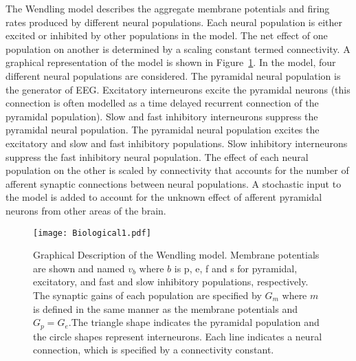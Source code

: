 The Wendling model describes the aggregate membrane potentials and firing rates produced by different neural populations. Each neural population is either excited or inhibited by other populations in the model. The net effect of one population on another is determined by a scaling constant termed connectivity. A graphical representation of the model is shown in Figure~\ref{fig: Biological}. In the model, four different neural populations are considered. The pyramidal neural population is the generator of EEG. Excitatory interneurons excite the pyramidal neurons (this connection is often modelled as a time delayed recurrent connection of the pyramidal population). Slow and fast inhibitory interneurons suppress the pyramidal neural population. The pyramidal neural population excites the excitatory and slow and fast inhibitory populations. Slow inhibitory interneurons suppress the fast inhibitory neural population. The effect of each neural population on the other is scaled by connectivity that accounts for the number of afferent synaptic connections between neural populations. A stochastic input to the model is added to account for the unknown effect of afferent pyramidal neurons from other areas of the brain.%
\begin{figure}  %
	\centering
		\texttt{[image: Biological1.pdf]}
	\caption{Graphical Description of the Wendling model. Membrane potentials are shown and named $v_{b}$ where $b$ is p, e, f and s for pyramidal, excitatory, and fast and slow inhibitory populations, respectively. The synaptic gains of each population are specified by $G_{m}$ where $m$ is defined in the same manner as the membrane potentials and $G_{p}=G_{e}$.The triangle shape indicates the pyramidal population and the circle shapes represent interneurons. Each line indicates a neural connection, which is specified by a connectivity constant.}
	\label{fig: Biological}
\end{figure}%

